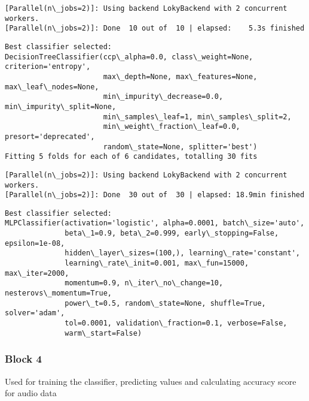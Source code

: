 \documentclass[11pt]{article}
\begin{document}
    \begin{Verbatim}[commandchars=\\\{\}]
[Parallel(n\_jobs=2)]: Using backend LokyBackend with 2 concurrent workers.
[Parallel(n\_jobs=2)]: Done  10 out of  10 | elapsed:    5.3s finished
    \end{Verbatim}

    \begin{Verbatim}[commandchars=\\\{\}]
Best classifier selected:
DecisionTreeClassifier(ccp\_alpha=0.0, class\_weight=None, criterion='entropy',
                       max\_depth=None, max\_features=None, max\_leaf\_nodes=None,
                       min\_impurity\_decrease=0.0, min\_impurity\_split=None,
                       min\_samples\_leaf=1, min\_samples\_split=2,
                       min\_weight\_fraction\_leaf=0.0, presort='deprecated',
                       random\_state=None, splitter='best')
Fitting 5 folds for each of 6 candidates, totalling 30 fits
    \end{Verbatim}

    \begin{Verbatim}[commandchars=\\\{\}]
[Parallel(n\_jobs=2)]: Using backend LokyBackend with 2 concurrent workers.
[Parallel(n\_jobs=2)]: Done  30 out of  30 | elapsed: 18.9min finished
    \end{Verbatim}

    \begin{Verbatim}[commandchars=\\\{\}]
Best classifier selected:
MLPClassifier(activation='logistic', alpha=0.0001, batch\_size='auto',
              beta\_1=0.9, beta\_2=0.999, early\_stopping=False, epsilon=1e-08,
              hidden\_layer\_sizes=(100,), learning\_rate='constant',
              learning\_rate\_init=0.001, max\_fun=15000, max\_iter=2000,
              momentum=0.9, n\_iter\_no\_change=10, nesterovs\_momentum=True,
              power\_t=0.5, random\_state=None, shuffle=True, solver='adam',
              tol=0.0001, validation\_fraction=0.1, verbose=False,
              warm\_start=False)
    \end{Verbatim}

    \hypertarget{block-4}{%
\subsubsection{Block 4}\label{block-4}}

Used for training the classifier, predicting values and calculating
accuracy score for audio data
\end{document}
